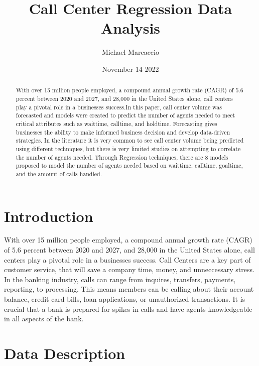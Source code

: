 \documentclass[12pt]{article}
\title{Call Center Regression Data Analysis}
\author{Michael  Marcaccio}
\date{November 14 2022}
\begin{document}
\maketitle

\begin{abstract}
 With over 15 million people employed, a compound annual growth rate (CAGR) of 5.6 percent between 2020 and 2027, and 28,000
 in the United States alone, call centers play a pivotal role in a businesses success.In this paper, call center volume was forecasted and
 models were created to predict the number of agents needed to meet critical attributes such as waittime, calltime, and holdtime. 
 Forecasting gives businesses the ability to make informed business decision and develop data-driven strategies. In the literature it is very
 common to see call center volume being predicted using different techniques, but there is very limited studies on attempting to correlate
 the number of agents needed. Through Regression techniques, there are 8 models proposed to model the number of agents needed based on waittime,
 calltime, goaltime, and the amount of calls handled.
\end{abstract}

\section*{Introduction}
With over 15 million people employed, a compound annual growth rate (CAGR) of 5.6 percent between 2020 and 2027, and 28,000
in the United States alone, call centers play a pivotal role in a businesses success. Call Centers are a key part of customer service,
that will save a company time, money, and unneccessary stress. In the banking industry, calls can range from inquires, transfers, 
payments, reporting, to processing. This means members can be calling about their account balance, credit card bills, loan applications, 
or unauthorized transactions. It is crucial that a bank is prepared for spikes in calls and have agents knowledgeable in all aspects of the bank.




    
\section*{Data Description}
\end{document}
